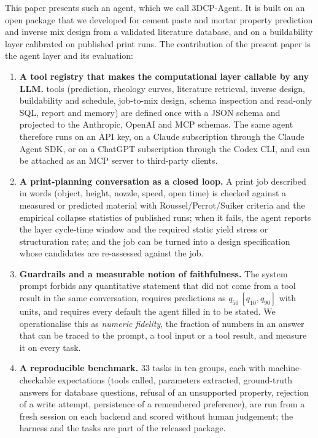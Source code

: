 \documentclass[preprint,12pt]{elsarticle}
\begin{document}
This paper presents such an agent, which we call 3DCP-Agent. It is built on an open package that we developed for cement paste and mortar property prediction and inverse mix design from a validated literature database, and on a buildability layer calibrated on published print runs. The contribution of the present paper is the agent layer and its evaluation:

\begin{enumerate}[nosep]
\item \textbf{A tool registry that makes the computational layer callable by any LLM.} \nnTools{} tools (prediction, rheology curves, literature retrieval, inverse design, buildability and schedule, job-to-mix design, schema inspection and read-only SQL, report and memory) are defined once with a JSON schema and projected to the Anthropic, OpenAI and MCP schemas. The same agent therefore runs on an API key, on a Claude subscription through the Claude Agent SDK, or on a ChatGPT subscription through the Codex CLI, and can be attached as an MCP server to third-party clients.
\item \textbf{A print-planning conversation as a closed loop.} A print job described in words (object, height, nozzle, speed, open time) is checked against a measured or predicted material with Roussel/Perrot/Suiker criteria and the empirical collapse statistics of \nprintRuns{} published runs; when it fails, the agent reports the layer cycle-time window and the required static yield stress or structuration rate; and the job can be turned into a design specification whose candidates are re-assessed against the job.
\item \textbf{Guardrails and a measurable notion of faithfulness.} The system prompt forbids any quantitative statement that did not come from a tool result in the same conversation, requires predictions as $q_{50}\,[q_{10}, q_{90}]$ with units, and requires every default the agent filled in to be stated. We operationalise this as \emph{numeric fidelity}, the fraction of numbers in an answer that can be traced to the prompt, a tool input or a tool result, and measure it on every task.
\item \textbf{A reproducible benchmark.} 33 tasks in ten groups, each with machine-checkable expectations (tools called, parameters extracted, ground-truth answers for database questions, refusal of an unsupported property, rejection of a write attempt, persistence of a remembered preference), are run from a fresh session on each backend and scored without human judgement; the harness and the tasks are part of the released package.
\end{enumerate}
\end{document}
